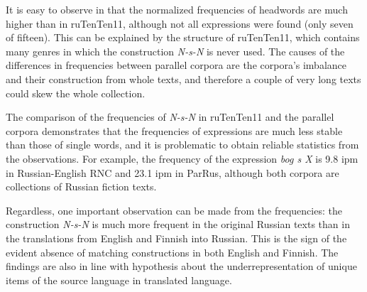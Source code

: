\documentclass[output=paper]{langscibook}
\begin{document}
\begin{table}
\caption{Frequencies of the headwords N-s-N construction in the parallel corpora.\label{tab:mikhailov:3}}
\end{table}

It is easy to observe in  that the normalized frequencies of headwords are much higher than in ruTenTen11, although not all expressions were found (only seven of fifteen). This can be explained by the structure of ruTenTen11, which contains many genres in which the construction \textit{N-s-N} is never used. The causes of the differences in frequencies between parallel corpora are the corpora’s imbalance and their construction from whole texts, and therefore a couple of very long texts could skew the whole collection.

The comparison of the frequencies of \textit{N-s-N} in ruTenTen11 and the parallel corpora demonstrates that the frequencies of expressions are much less stable than those of single words, and it is problematic to obtain reliable statistics from the observations. For example, the frequency of the expression \textit{bog s X} is 9.8 ipm in Russian-English RNC and 23.1 ipm in ParRus, although both corpora are collections of Russian fiction texts.

Regardless, one important observation can be made from the frequencies: the construction \textit{N-s-N} is much more frequent in the original Russian texts than in the translations from English and Finnish into Russian. This is the sign of the evident absence of matching constructions in both English and Finnish. The findings are also in line with  hypothesis about the underrepresentation of unique items of the source language in translated language.
\end{document}
